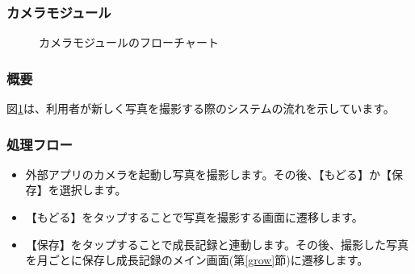 \documentclass[a4j]{jarticle}
\begin{document}
\subsubsection{カメラモジュール\label{Camera}}
\begin{figure}[H]
    \begin{center}
    \caption {カメラモジュールのフローチャート}
    \label{camera}
    \end{center}
\end{figure}

\subsubsection*{概要}
図\ref{camera}は、利用者が新しく写真を撮影する際のシステムの流れを示しています。

\subsubsection*{処理フロー}
\begin{itemize}
\item 外部アプリのカメラを起動し写真を撮影します。その後、【もどる】か【保存】を選択します。
\item 【もどる】をタップすることで写真を撮影する画面に遷移します。
\item 【保存】をタップすることで成長記録と連動します。その後、撮影した写真を月ごとに保存し成長記録のメイン画面(第\ref{grow}節)に遷移します。
\end{itemize}
\end{document}
